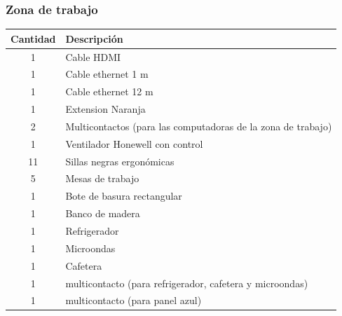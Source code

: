 \documentclass[a4paper,11pt]{article}                 %
\begin{document}
  \subsubsection*{Zona de trabajo}
    \begin{table}[H]
    \centering
    \begin{tabular}{|c|l|}
    \hline
    Cantidad & Descripción                                                  \\ \hline
    1        & Cable HDMI                                                   \\ \hline
    1        & Cable ethernet 1 m                                           \\ \hline
    1        & Cable ethernet 12 m                                          \\ \hline
    1        & Extension Naranja                                            \\ \hline
    2        & Multicontactos (para las computadoras de la zona de trabajo) \\ \hline
    1        & Ventilador Honewell con control                              \\ \hline
    11       & Sillas negras ergonómicas                                    \\ \hline
    5        & Mesas de trabajo                                             \\ \hline
    1        & Bote de basura rectangular                                   \\ \hline
    1        & Banco de madera                                              \\ \hline
    1        & Refrigerador                                                 \\ \hline
    1        & Microondas                                                   \\ \hline
    1        & Cafetera                                                     \\ \hline
    1        & multicontacto (para refrigerador, cafetera y microondas)     \\ \hline
    1        & multicontacto (para panel azul)                              \\ \hline
    \end{tabular}
    \end{table}
\end{document}
